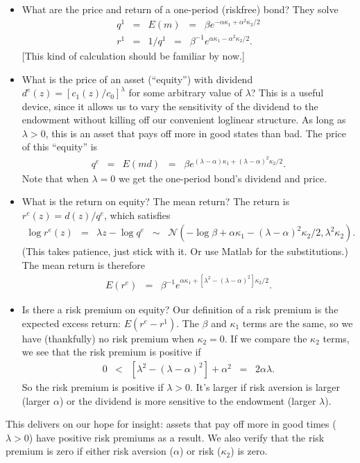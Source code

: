 \documentclass[11pt]{article}
\begin{document}
\begin{itemize}
\item What are the price and return of a one-period (riskfree) bond?
They solve
\begin{eqnarray*}
    q^1 &=& E(m) \;\;=\;\; \beta e^{ - \alpha \kappa_1 + \alpha^2 \kappa_2/2 } \\
    r^1 &=& 1/q^1 \;\;=\;\; \beta^{-1} e^{\alpha \kappa_1 - \alpha^2 \kappa_2/2 } .
\end{eqnarray*}
[This kind of calculation should be familiar by now.]
\item What is the price of an asset (``equity'') with dividend
$d^e(z) = [c_1(z)/c_0]^\lambda$ for some
arbitrary value of $\lambda$?
This is a useful device, since it allows us to vary the sensitivity of the dividend
to the endowment without killing off our convenient loglinear structure.
As long as $\lambda > 0$, this is an asset that pays off more in good states than bad.
The price of this ``equity'' is
\begin{eqnarray*}
    q^e &=& E(md) \;\;=\;\; \beta e^{ (\lambda- \alpha) \kappa_1
    + (\lambda-\alpha)^2 \kappa_2/2 } .
\end{eqnarray*}
Note that when $\lambda = 0$ we get the one-period bond's dividend and price.
\item What is the return on equity?  The mean return?
The return is $r^e(z) = d(z)/q^e$, which satisfies
\begin{eqnarray*}
    \log r^e(z) &=& \lambda z - \log q^e
            \;\;\sim \;\; \mathcal{N}
            (-\log \beta + \alpha \kappa_1 - (\lambda-\alpha)^2 \kappa_2/2, \lambda^2 \kappa_2) .
\end{eqnarray*}
(This takes patience, just stick with it.  Or use Matlab for the substitutions.)
The mean return is therefore
\begin{eqnarray*}
    E (r^e) &=& \beta^{-1} e^{\alpha \kappa_1 + [\lambda^2 - (\lambda-\alpha)^2] \kappa_2/2 } .
\end{eqnarray*}

\item Is there a risk premium on equity?
Our definition of a risk premium is the expected excess return:  $E(r^e-r^1)$.
The $\beta$ and $\kappa_1$ terms are the same, so we have (thankfully)
no risk premium when $\kappa_2 = 0$.
If we compare the $\kappa_2$ terms, we see that the risk premium is positive if
\begin{eqnarray*}
    0 &<& [\lambda^2 - (\lambda-\alpha)^2] + \alpha^2 \;\;=\;\; 2 \alpha \lambda .
\end{eqnarray*}
So the risk premium is positive if $\lambda > 0$.
It's larger if risk aversion is larger (larger $\alpha$)
or the dividend is more sensitive to the endowment (larger $\lambda$).
\end{itemize}
This delivers on our hope for insight:
assets that pay off more in good times ($\lambda>0$) have positive risk premiums as a result.
We also verify that the risk premium is  zero
if either risk aversion ($\alpha$) or risk ($\kappa_2$) is zero.
\end{document}
